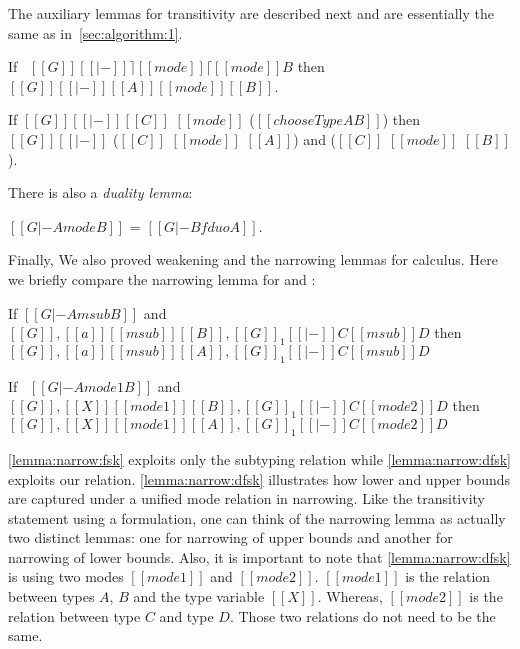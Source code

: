 The auxiliary lemmas for transitivity are described next and are
essentially the same as in~\cref{sec:algorithm:1}.

\begin{lemma}
  \label{lemma:invbound:dkfs}
  If \ $[[G]] [[|-]] \rceil [[mode]] \lceil [[mode]] B$  then $[[G]] [[|-]] [[A]] [[mode]] [[B]]$.
\end{lemma}

\begin{lemma}
  \label{lemma:ddboth-inv::dkfs}
  If $ [[G]] [[|-]] [[C]]$ $[[mode]]$ ($[[chooseType A  B]]$) then $[[G]] [[|-]]$ ($[[C]]$ $[[mode]]$ $[[A]]$) and  ($[[C]]$ $[[mode]]$ $[[B]]$).
\end{lemma}

\noindent There is also a \emph{duality lemma}:

\begin{lemma}[Duality]
  \label{lemma:sym2:dkfs}
   $[[G |- A mode B]]$ = $[[G |- B fduo A]]$.
\end{lemma}

Finally, We also proved weakening and the
narrowing lemmas for \nameduo calculus.
Here we briefly compare the narrowing lemma for \fskiu and
\gfskiu: 

\begin{lemma}
If $[[G |- A msub B]]$ and $[[G]] , [[a]] [[msub]] [[B]], [[G]]_1
[[|-]] C [[msub]] D$ then $[[G]] , [[a]] [[msub]] [[A]], [[G]]_1 [[|-]] C [[msub]] D$
 \label{lemma:narrow:fsk}
\end{lemma}

\begin{lemma}
If \ $[[G |- A mode1 B]]$ and $[[G]] , [[X]]  [[mode1]]
[[B]], [[G]]_1 [[|-]] C [[mode2]] D$ then $[[G]] , [[X]] [[mode1]] [[A]], [[G]]_1 [[|-]] C [[mode2]] D$
 \label{lemma:narrow:dfsk}
\end{lemma}

\noindent \cref{lemma:narrow:fsk} exploits only the subtyping relation
while \cref{lemma:narrow:dfsk} exploits our \nameduo relation.
\cref{lemma:narrow:dfsk} illustrates how lower and upper bounds are
captured under a unified mode relation in narrowing.  Like the
transitivity statement using a \nameduo formulation, one can think of the
\nameduo narrowing lemma as actually two distinct lemmas: one for
narrowing of upper bounds and another for narrowing of lower bounds.
Also, it is important to note that \cref{lemma:narrow:dfsk} is using
two modes $[[mode1]]$ and $[[mode2]]$. $[[mode1]]$ is the relation
between types $A$, $B$ and the type variable $[[X]]$. Whereas, $[[mode2]]$ is the relation
between type $C$ and type $D$.
Those two relations do not need to be the same.

